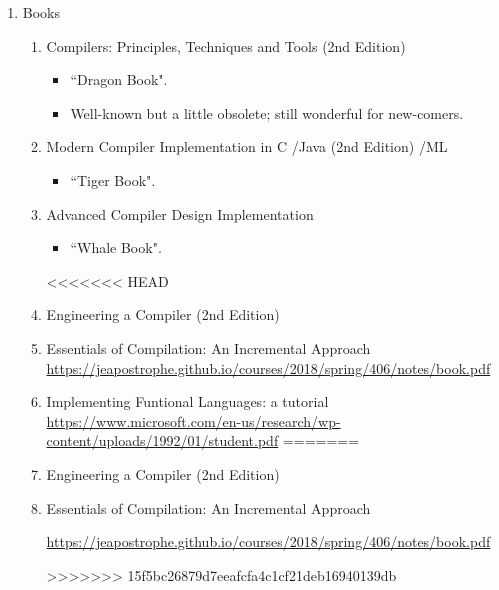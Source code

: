 \documentclass{article}
\begin{document}
\begin{enumerate}
    \item Books
    \begin{enumerate}
        \item Compilers: Principles, Techniques and Tools (2nd Edition) \cite{aho2007compilers}
        \begin{itemize}
            \item ``Dragon Book".
            \item Well-known but a little obsolete; still wonderful for new-comers.
        \end{itemize}
        \item Modern Compiler Implementation in C \cite{appel2004modern}/Java (2nd Edition) \cite{appel2003modern}/ML \cite{appel1998modern}
        \begin{itemize}
            \item ``Tiger Book".
        \end{itemize}
        \item Advanced Compiler Design Implementation \cite{muchnick1997advanced}
        \begin{itemize}
            \item ``Whale Book".
        \end{itemize}
<<<<<<< HEAD
        \item Engineering a Compiler (2nd Edition) \cite{cooper2011engineering}    
        \item Essentials of Compilation: An Incremental Approach\\
            \href{https://jeapostrophe.github.io/courses/2018/spring/406/notes/book.pdf}{https://jeapostrophe.github.io/courses/2018/spring/406/notes/book.pdf}
        \item Implementing Funtional Languages: a tutorial\\
        \href{https://www.microsoft.com/en-us/research/wp-content/uploads/1992/01/student.pdf}{https://www.microsoft.com/en-us/research/wp-content/uploads/1992/01/student.pdf}
=======
        \item Engineering a Compiler (2nd Edition) \cite{cooper2011engineering}    \item Essentials of Compilation: An Incremental Approach

        \href{https://jeapostrophe.github.io/courses/2018/spring/406/notes/book.pdf}{https://jeapostrophe.github.io/courses/2018/spring/406/notes/book.pdf}
        
>>>>>>> 15f5bc26879d7eeafcfa4c1cf21deb16940139db
    \end{enumerate}
    

\end{enumerate}
\end{document}
